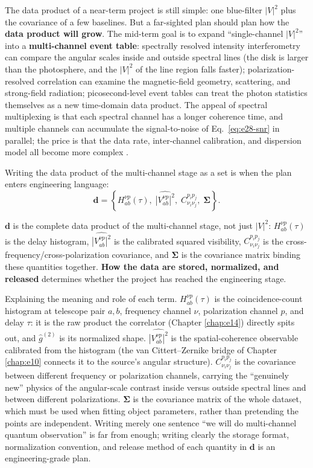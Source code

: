 The data product of a near-term project is still simple: one blue-filter \(|V|^2\) plus the covariance of a few baselines. But a far-sighted plan should plan how the \textbf{data product will grow}. The mid-term goal is to expand ``single-channel \(|V|^2\)'' into a \textbf{multi-channel event table}: spectrally resolved intensity interferometry can compare the angular scales inside and outside spectral lines (the disk is larger than the photosphere, and the \(|V|^2\) of the line region falls faster); polarization-resolved correlation can examine the magnetic-field geometry, scattering, and strong-field radiation; picosecond-level event tables can treat the photon statistics themselves as a new time-domain data product. The appeal of spectral multiplexing is that each spectral channel has a longer coherence time, and multiple channels can accumulate the signal-to-noise of Eq.\ \eqref{eq:e28-snr} in parallel; the price is that the data rate, inter-channel calibration, and dispersion model all become more complex \citep{2021sf2a.conf..335L,2022MNRAS.512.1722K,2024MNRAS.529.4387A}.

Writing the data product of the multi-channel stage as a set is when the plan enters engineering language:
\begin{equation}
  \bm{d}=
  \left\{
  H_{ab}^{\nu p}(\tau),\;
  \widehat{|V_{ab}^{\nu p}|^2},\;
  C_{\nu_i\nu_j}^{p_i p_j},\;
  \bm{\Sigma}
  \right\}.
  \label{eq:e28-data}
\end{equation}
\begin{formulaexplain}
\(\bm d\) is the complete data product of the multi-channel stage, not just \(|V|^2\): \(H_{ab}^{\nu p}(\tau)\) is the delay histogram, \(\widehat{|V_{ab}^{\nu p}|^2}\) is the calibrated squared visibility, \(C_{\nu_i\nu_j}^{p_i p_j}\) is the cross-frequency/cross-polarization covariance, and \(\bm\Sigma\) is the covariance matrix binding these quantities together. \textbf{How the data are stored, normalized, and released} determines whether the project has reached the engineering stage.
\end{formulaexplain}
Explaining the meaning and role of each term. \(H_{ab}^{\nu p}(\tau)\) is the coincidence-count histogram at telescope pair \(a,b\), frequency channel \(\nu\), polarization channel \(p\), and delay \(\tau\): it is the raw product the correlator (Chapter \ref{chap:e14}) directly spits out, and \(\hat g^{(2)}\) is its normalized shape. \(\widehat{|V_{ab}^{\nu p}|^2}\) is the spatial-coherence observable calibrated from the histogram (the van Cittert--Zernike bridge of Chapter \ref{chap:e10} connects it to the source's angular structure). \(C_{\nu_i\nu_j}^{p_i p_j}\) is the covariance between different frequency or polarization channels, carrying the ``genuinely new'' physics of the angular-scale contrast inside versus outside spectral lines and between different polarizations. \(\bm\Sigma\) is the covariance matrix of the whole dataset, which must be used when fitting object parameters, rather than pretending the points are independent. Writing merely one sentence ``we will do multi-channel quantum observation'' is far from enough; writing clearly the storage format, normalization convention, and release method of each quantity in \(\bm d\) is an engineering-grade plan.

